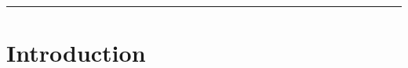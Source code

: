 \documentclass[12pt, a4paper]{article}
\newcommand{\TODO}{\hl{\textbf{TODO}}}
\begin{document}
\rule{\textwidth}{0.4pt}

\newpage
\section*{Introduction}
%
%	
\end{document}
